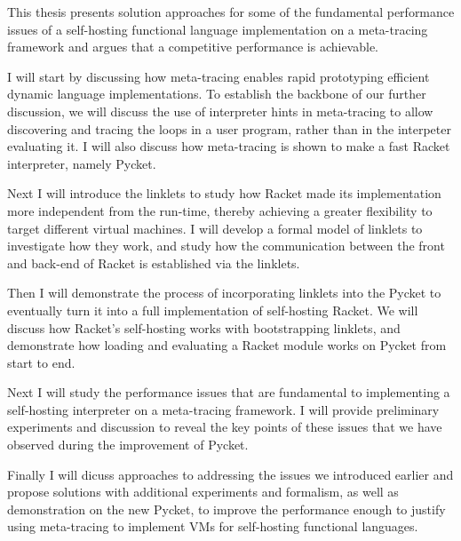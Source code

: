 This thesis presents solution approaches for some of the fundamental
performance issues of a self-hosting functional language
implementation on a meta-tracing framework and argues that a
competitive performance is achievable.

I will start by discussing how meta-tracing enables rapid prototyping
efficient dynamic language implementations. To establish the backbone
of our further discussion, we will discuss the use of interpreter
hints in meta-tracing to allow discovering and tracing the loops in a
user program, rather than in the interpeter evaluating it. I will also
discuss how meta-tracing is shown to make a fast Racket interpreter,
namely Pycket.

Next I will introduce the linklets to study how Racket made its
implementation more independent from the run-time, thereby achieving a
greater flexibility to target different virtual machines. I will
develop a formal model of linklets to investigate how they work, and
study how the communication between the front and back-end of Racket
is established via the linklets.

Then I will demonstrate the process of incorporating linklets into the
Pycket to eventually turn it into a full implementation of
self-hosting Racket. We will discuss how Racket's self-hosting works
with bootstrapping linklets, and demonstrate how loading and
evaluating a Racket module works on Pycket from start to end.

Next I will study the performance issues that are fundamental to
implementing a self-hosting interpreter on a meta-tracing framework. I
will provide preliminary experiments and discussion to reveal the key
points of these issues that we have observed during the improvement of
Pycket.

Finally I will dicuss approaches to addressing the issues we
introduced earlier and propose solutions with additional experiments
and formalism, as well as demonstration on the new Pycket, to improve
the performance enough to justify using meta-tracing to implement VMs
for self-hosting functional languages.
